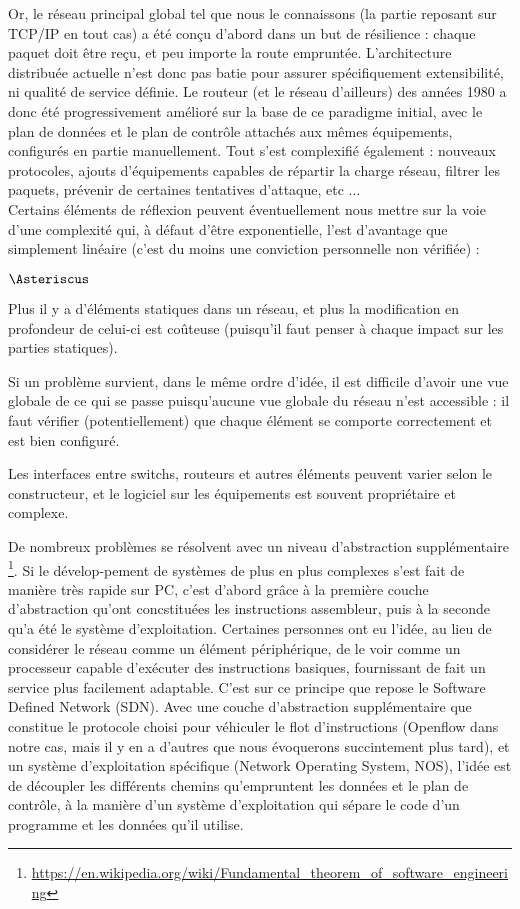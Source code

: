 Or, le réseau principal global tel que nous le connaissons (la partie reposant sur TCP/IP en tout cas) a été conçu d'abord dans un but de résilience : chaque paquet doit être reçu, et peu importe la route empruntée. L'architecture distribuée actuelle n'est donc pas batie pour assurer spécifiquement extensibilité, ni qualité de service définie. Le routeur (et le réseau d'ailleurs) des années 1980 a donc été progressivement amélioré sur la base de ce paradigme initial, avec le plan de données et le plan de contrôle attachés aux mêmes équipements, configurés en partie manuellement. Tout s'est complexifié également : nouveaux protocoles, ajouts d'équipements capables de répartir la charge réseau, filtrer les paquets, prévenir de certaines tentatives d'attaque, etc ...\\
Certains éléments de réflexion peuvent éventuellement nous mettre sur la voie d'une complexité qui, à défaut d'être exponentielle, l'est d'avantage que simplement linéaire (c'est du moins une conviction personnelle non vérifiée) :

\begin{list}{$\Asteriscus$}{}
\item Plus il y a d'éléments statiques dans un réseau, et plus la modification en profondeur de celui-ci est coûteuse (puisqu'il faut penser à chaque impact sur les parties statiques).
\item Si un problème survient, dans le même ordre d'idée, il est difficile d'avoir une vue globale de ce qui se passe puisqu'aucune vue globale du réseau n'est accessible : il faut vérifier (potentiellement) que chaque élément se comporte correctement et est bien configuré.
\item Les interfaces entre switchs, routeurs et autres éléments peuvent varier selon le constructeur, et le logiciel sur les équipements est souvent propriétaire et complexe.
\end{list}

De nombreux problèmes se résolvent avec un niveau d'abstraction supplémentaire \footnote{\label{indirection}\url{https://en.wikipedia.org/wiki/Fundamental_theorem_of_software_engineering}}. Si le dévelop-pement de systèmes de plus en plus complexes s'est fait de manière très rapide sur PC, c'est d'abord grâce à la première couche d'abstraction qu'ont concstituées les instructions assembleur, puis à la seconde qu'a été le système d'exploitation. Certaines personnes ont eu l'idée, au lieu de considérer le réseau comme un élément périphérique, de le voir comme un processeur capable d'exécuter des instructions basiques, fournissant de fait un service plus facilement adaptable. C'est sur ce principe que repose le Software Defined Network (SDN). Avec une couche d'abstraction supplémentaire que constitue le protocole choisi pour véhiculer le flot d'instructions (Openflow dans notre cas, mais il y en a d'autres que nous évoquerons succintement plus tard), et un système d'exploitation spécifique (Network Operating System, NOS), l'idée est de découpler les différents chemins qu'empruntent les données et le plan de contrôle, à la manière d'un système d'exploitation qui sépare le code d'un programme et les données qu'il utilise.